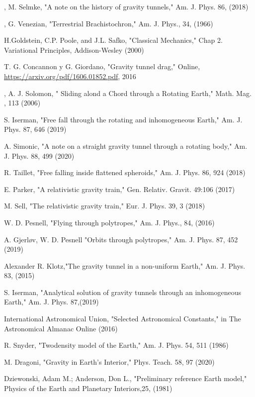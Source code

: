 \documentclass[aps,twocolumn,showpacs,preprintnumbers]{revtex4}
\begin{document}
\begin{thebibliography}{10}

, M. Selmke, "A note on the history of gravity tunnels," Am. J. Phys. 86, (2018)


, G. Venezian, "Terrestrial Brachistochron," Am. J. Phys., 34, (1966)

 H.Goldstein, C.P. Poole, and J.L. Safko, "Classical Mechanics," Chap 2. Variational Principles, Addison-Wesley (2000)

 T. G. Concannon y G. Giordano, "Gravity tunnel drag," Online, \url{https://arxiv.org/pdf/1606.01852.pdf},  2016

, A. J. Solomon, " Sliding alond a Chord through a Rotating Earth,"  Math. Mag. , 113 (2006)

 S. Iserman, "Free fall through the rotating and inhomogeneous Earth," Am. J. Phys. 87, 646 (2019)

 A. Simonic, "A note on a straight gravity tunnel through a rotating body," Am. J. Phys. 88, 499 (2020)

 R. Taillet, "Free falling inside flattened spheroids," Am. J. Phys. 86, 924 (2018)

 E. Parker, "A relativistic gravity train," Gen. Relativ. Gravit.  49:106 (2017)

 M. Sell, "The relativistic gravity train," Eur. J. Phys. 39, 3 (2018) 

 W. D. Pesnell, "Flying through polytropes," Am. J. Phys., 84, (2016)    

 A. Gjerl\o v, W. D. Pesnell "Orbits through polytropes," Am. J. Phys. 87, 452 (2019)    

 Alexander R. Klotz,"The gravity tunnel in a non-uniform Earth," Am. J. Phys. 83, (2015)

 S. Iserman, "Analytical solution of gravity tunnels through an inhomogeneous Earth," Am. J. Phys. 87,(2019)
    
 International Astronomical Union,  "Selected Astronomical Constants,"  in The Astronomical Almanac Online (2016)

 R. Snyder, "Twodensity model of the Earth," Am. J. Phys. 54, 511 (1986)

 M. Dragoni, "Gravity in Earth’s Interior," Phys. Teach. 58, 97 (2020) 

 Dziewonski, Adam M.; Anderson, Don L., "Preliminary reference Earth model," Physics of the Earth and Planetary Interiors,25, (1981)









    



\end{thebibliography}


  
\end{document}
